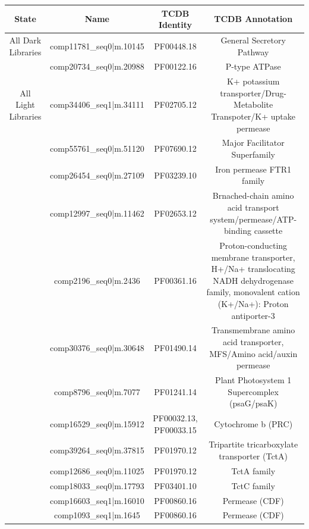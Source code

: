 \begin{table}
    \begin{tabular}{|c|c|c|c|}
        \hline
        \textbf{State} & \textbf{Name} & \textbf{TCDB Identity} & \textbf{TCDB Annotation}\\
        \hline
        All Dark Libraries  & comp11781\_seq0|m.10145 & PF00448.18 & General Secretory Pathway \\
                            & comp20734\_seq0|m.20988 & PF00122.16 & P-type ATPase \\
        \hline
        All Light Libraries & comp34406\_seq1|m.34111 & PF02705.12 & K+ potassium transporter/Drug-Metabolite Transpoter/K+ uptake permease\\
                            & comp55761\_seq0|m.51120 & PF07690.12 & Major Facilitator Superfamily \\  %
                            & comp26454\_seq0|m.27109 & PF03239.10 & Iron permease FTR1 family  \\
                            & comp12997\_seq0|m.11462 & PF02653.12 & Brnached-chain amino acid transport system/permease/ATP-binding cassette\\
                            & comp2196\_seq0|m.2436   & PF00361.16 & Proton-conducting membrane transporter, H+/Na+ translocating NADH dehydrogenase family, monovalent cation (K+/Na+): Proton antiporter-3 \\
                            & comp30376\_seq0|m.30648 & PF01490.14 & Transmembrane amino acid transporter, MFS/Amino acid/auxin permease\\
                            & comp8796\_seq0|m.7077   & PF01241.14 & Plant Photosystem 1 Supercomplex (psaG/psaK) \\
                            & comp16529\_seq0|m.15912 & PF00032.13, PF00033.15 & Cytochrome b (PRC) \\
                            & comp39264\_seq0|m.37815 & PF01970.12 & Tripartite tricarboxylate transporter (TctA) \\
                            & comp12686\_seq0|m.11025 & PF01970.12 & TctA family  \\
                            & comp18033\_seq0|m.17793 & PF03401.10 & TctC family \\
                            & comp16603\_seq1|m.16010 & PF00860.16 & Permease (CDF) \\
                            & comp1093\_seq1|m.1645   & PF00860.16 & Permease (CDF) \\

\end{tabular}
\end{table}

